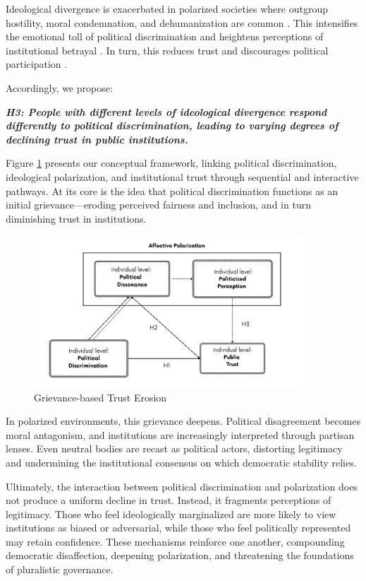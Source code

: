 \documentclass{article}
\begin{document}
Ideological divergence is exacerbated in polarized societies where outgroup hostility, moral condemnation, and dehumanization are common \parencite{iyengar_fear_2015}. This intensifies the emotional toll of political discrimination and heightens perceptions of institutional betrayal \parencite{hetherington_why_2015}. In turn, this reduces trust and discourages political participation \parencite{michelson_corrosive_2003, lelkes_limits_2017}.

Accordingly, we propose:

\emph{\textbf{\small
H3: People with different levels of ideological divergence respond differently to political discrimination, leading to varying degrees of declining trust in public institutions.
}}

Figure \ref{fig:0} presents our conceptual framework, linking political discrimination, ideological polarization, and institutional trust through sequential and interactive pathways. At its core is the idea that political discrimination functions as an initial grievance—eroding perceived fairness and inclusion, and in turn diminishing trust in institutions.

\begin{figure}[htbp]
\centering
\caption{Grievance-based Trust Erosion}
\label{fig:0}
\includegraphics[width=0.9\textwidth]{"viz/theoretical_diagram.png"}
\end{figure}

In polarized environments, this grievance deepens. Political disagreement becomes moral antagonism, and institutions are increasingly interpreted through partisan lenses. Even neutral bodies are recast as political actors, distorting legitimacy and undermining the institutional consensus on which democratic stability relies.

Ultimately, the interaction between political discrimination and polarization does not produce a uniform decline in trust. Instead, it fragments perceptions of legitimacy. Those who feel ideologically marginalized are more likely to view institutions as biased or adversarial, while those who feel politically represented may retain confidence. These mechanisms reinforce one another, compounding democratic disaffection, deepening polarization, and threatening the foundations of pluralistic governance.
\end{document}

